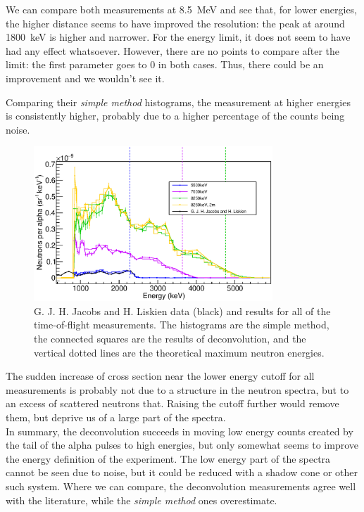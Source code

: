 \documentclass[a4paper,12pt]{report}
\begin{document}
We can compare both measurements at \qty{8.5}{\MeV} and see that, for lower energies, the higher distance seems to have improved the resolution: the peak at around \qty{1800}{\keV} is higher and narrower.
For the energy limit, it does not seem to have had any effect whatsoever.
However, there are no points to compare after the limit: the first parameter goes to 0 in both cases.
Thus, there could be an improvement and we wouldn't see it.

Comparing their \textit{simple method} histograms, the measurement at higher energies is consistently higher, probably due to a higher percentage of the counts being noise.
\\

\begin{figure}[H]
	\centering
	\includegraphics[width=0.80\textwidth]{pulsed_results.eps}
	\caption{G. J. H. Jacobs and H. Liskien data (black) and results for all of the time-of-flight measurements.
	The histograms are the simple method, the connected squares are the results of deconvolution, and the vertical dotted lines are the theoretical maximum neutron energies.}
	\label{pulsed_results}
\end{figure}

The sudden increase of cross section near the lower energy cutoff for all measurements is probably not due to a structure in the neutron spectra, but to an excess of scattered neutrons that.
Raising the cutoff further would remove them, but deprive us of a large part of the spectra.
\\

In summary, the deconvolution succeeds in moving low energy counts created by the tail of the alpha pulses to high energies, but only somewhat seems to improve the energy definition of the experiment.
The low energy part of the spectra cannot be seen due to noise, but it could be reduced with a shadow cone or other such system.
Where we can compare, the deconvolution measurements agree well with the literature, while the \textit{simple method} ones overestimate.
\end{document}
